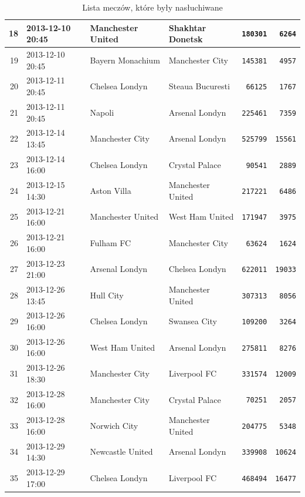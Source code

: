 \begin{table}[ht!]
\begin{center}
\begin{tabular}{|r|l|l|l|r|r|}
18 & 2013-12-10 20:45 & Manchester United & Shakhtar Donetsk & \texttt{180301} & \texttt{6264}	\\ \hline
19 & 2013-12-10 20:45 & Bayern Monachium & Manchester City & \texttt{145381} & \texttt{4957}	\\ \hline
20 & 2013-12-11 20:45 & Chelsea Londyn & Steaua Bucuresti & \texttt{66125} & \texttt{1767}	\\ \hline
21 & 2013-12-11 20:45 & Napoli & Arsenal Londyn & \texttt{225461} & \texttt{7359}	\\ \hline
22 & 2013-12-14 13:45 & Manchester City & Arsenal Londyn & \texttt{525799} & \texttt{15561}	\\ \hline
23 & 2013-12-14 16:00 & Chelsea Londyn & Crystal Palace & \texttt{90541} & \texttt{2889}	\\ \hline
24 & 2013-12-15 14:30 & Aston Villa & Manchester United & \texttt{217221} & \texttt{6486}	\\ \hline
25 & 2013-12-21 16:00 & Manchester United & West Ham United & \texttt{171947} & \texttt{3975}	\\ \hline
26 & 2013-12-21 16:00 & Fulham FC & Manchester City & \texttt{63624} & \texttt{1624}	\\ \hline
27 & 2013-12-23 21:00 & Arsenal Londyn & Chelsea Londyn & \texttt{622011} & \texttt{19033}	\\ \hline
28 & 2013-12-26 13:45 & Hull City & Manchester United & \texttt{307313} & \texttt{8056}	\\ \hline
29 & 2013-12-26 16:00 & Chelsea Londyn & Swansea City & \texttt{109200} & \texttt{3264}	\\ \hline
30 & 2013-12-26 16:00 & West Ham United & Arsenal Londyn & \texttt{275811} & \texttt{8276}	\\ \hline
31 & 2013-12-26 18:30 & Manchester City & Liverpool FC & \texttt{331574} & \texttt{12009}	\\ \hline
32 & 2013-12-28 16:00 & Manchester City & Crystal Palace & \texttt{70251} & \texttt{2057}	\\ \hline
33 & 2013-12-28 16:00 & Norwich City & Manchester United & \texttt{204775} & \texttt{5348}	\\ \hline
34 & 2013-12-29 14:30 & Newcastle United & Arsenal Londyn & \texttt{339908} & \texttt{10624}	\\ \hline
35 & 2013-12-29 17:00 & Chelsea Londyn & Liverpool FC & \texttt{468494} & \texttt{16477}	\\ \hline
\end{tabular} 
\end{center} 
\caption{Lista meczów, które były nasłuchiwane}
\label{table:listameczow}
\end{table}





















